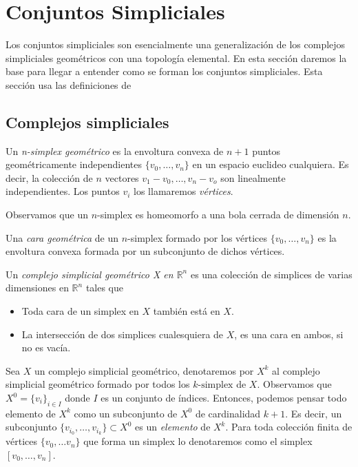 \documentclass[../main.tex]{subfiles}
\begin{document}
\section{Conjuntos Simpliciales}
Los conjuntos simpliciales son esencialmente una generalizaci\'on de los complejos simpliciales geom\'etricos con una topolog\'ia elemental. En esta secci\'on daremos la base para llegar a entender como se forman los conjuntos simpliciales. Esta secci\'on usa las definiciones de \cite[Cap\'itulos 2 y 3]{SS}
\subsection{Complejos simpliciales}
\begin{defi}
    Un \emph{n-simplex geom\'etrico} es la envoltura convexa de $n+1$ puntos geom\'etricamente independientes $\{v_0,\dots,v_n\}$ en un espacio euclideo cualquiera. Es decir, la colecci\'on de $n$ vectores $v_1-v_0,\dots,v_n-v_o$ son linealmente independientes.
    Los puntos $v_i$ los llamaremos \emph{v\'ertices}.

    Observamos que un $n$-simplex es homeomorfo a una bola cerrada de dimensi\'on $n$.
\end{defi}
\begin{defi}
    Una \emph{cara geom\'etrica} de un $n$-simplex formado por los v\'ertices $\{v_0,\dots,v_n\}$ es la envoltura convexa formada por un subconjunto de dichos v\'ertices.
\end{defi}
\begin{defi}
    Un \emph{complejo simplicial geom\'etrico X en $\mathbb{R}^n$} es una colecci\'on de simplices de varias dimensiones en $\mathbb{R}^n$ tales que
    \begin{itemize}
        \item Toda cara de un simplex en $X$ tambi\'en est\'a en $X$.
        \item La intersecci\'on de dos simplices cualesquiera de $X$, es una cara en ambos, si no es vac\'ia.
    \end{itemize}
\end{defi}

Sea $X$ un complejo simplicial geom\'etrico, denotaremos por  $X^k$ al complejo simplicial geom\'etrico formado por todos los $k\text{-simplex}$ de $X$.
Observamos que $X^0 = \{v_i\}_{i\in I}$ donde $I$ es un conjunto de \'indices. Entonces, podemos pensar todo elemento de $X^k$ como un subconjunto de $X^0$ de cardinalidad $k+1$.
Es decir, un subconjunto $\{v_{i_0},\dots,v_{i_k}\}\subset X^0$ es un \emph{elemento} de $X^k$.
Para toda colecci\'on finita de v\'ertices $\{v_0,\dots v_n\}$ que forma un simplex lo denotaremos como el simplex $[v_0,\dots,v_n]$.
\end{document}
